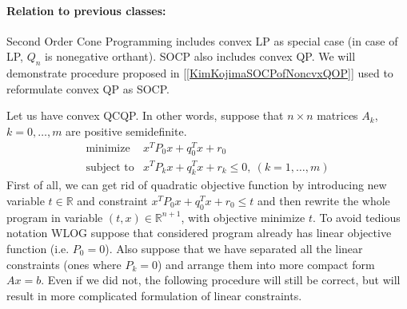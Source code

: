 \documentclass[10pt,oneside]{book}
\theoremstyle{definition}
\begin{document}
\paragraph{Relation to previous classes:}

Second Order Cone Programming includes convex LP as special case (in case of LP, $Q_n$ is nonegative orthant).
SOCP also includes convex QP. We will demonstrate procedure proposed in [\ref{KimKojimaSOCPofNoncvxQOP}] used to reformulate convex QP as SOCP.

Let us have convex QCQP. In other words, suppose that $n\times n$ matrices $A_k$, $k=0,\dots ,m$ are positive semidefinite. 
\begin{equation}
\begin{array}{ll}
\mbox{minimize}& x^TP_0x + q_0^Tx + r_0 \\
\mbox{subject to}& x^TP_kx + q_k^Tx + r_k \leq 0, \  (k = 1,\dots ,m)
\end{array} 
\end{equation}
First of all, we can get rid of quadratic objective function by introducing new variable $t\in \mathbb{R}$ and constraint $x^TP_0x + q_0^Tx +r_0 \leq t$ and then rewrite the whole program in variable $(t,x)\in \mathbb{R}^{n+1}$, with objective minimize $t$. To avoid tedious notation WLOG suppose that considered program already has linear objective function (i.e. $P_0 = 0$).  Also suppose that we have separated all the linear constraints (ones where $P_k = 0$) and arrange them into more compact form $Ax=b$. Even if we did not, the following procedure will still be correct, but will result in more complicated formulation of linear constraints.
\end{document}
